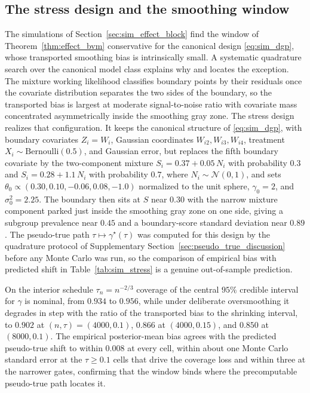 \documentclass[11pt]{article}
\theoremstyle{definition}
\theoremstyle{plain}
\begin{document}
\subsection{The stress design and the smoothing window}
\label{sec:stress_design}

The simulations of Section~\ref{sec:sim_effect_block} find the window of Theorem~\ref{thm:effect_bvm} conservative for the canonical design \eqref{eq:sim_dgp}, whose transported smoothing bias is intrinsically small. A systematic quadrature search over the canonical model class explains why and locates the exception. The mixture working likelihood classifies boundary points by their residuals once the covariate distribution separates the two sides of the boundary, so the transported bias is largest at moderate signal-to-noise ratio with covariate mass concentrated asymmetrically inside the smoothing gray zone. The stress design realizes that configuration. It keeps the canonical structure of \eqref{eq:sim_dgp}, with boundary covariates $Z_i=W_i$, Gaussian coordinates $W_{i2},W_{i3},W_{i4}$, treatment $X_i\sim\mathrm{Bernoulli}(0.5)$, and Gaussian error, but replaces the fifth boundary covariate by the two-component mixture $S_i=0.37+0.05\,N_i$ with probability $0.3$ and $S_i=0.28+1.1\,N_i$ with probability $0.7$, where $N_i\sim\mathcal N(0,1)$, and sets $\theta_0\propto(0.30,0.10,-0.06,0.08,-1.0)$ normalized to the unit sphere, $\gamma_0=2$, and $\sigma_0^2=2.25$. The boundary then sits at $S$ near $0.30$ with the narrow mixture component parked just inside the smoothing gray zone on one side, giving a subgroup prevalence near $0.45$ and a boundary-score standard deviation near $0.89$. The pseudo-true path $\tau\mapsto\gamma^\star(\tau)$ was computed for this design by the quadrature protocol of Supplementary Section~\ref{sec:pseudo_true_discussion} before any Monte Carlo was run, so the comparison of empirical bias with predicted shift in Table~\ref{tab:sim_stress} is a genuine out-of-sample prediction.

On the interior schedule $\tau_n=n^{-2/3}$ coverage of the central $95\%$ credible interval for $\gamma$ is nominal, from $0.934$ to $0.956$, while under deliberate oversmoothing it degrades in step with the ratio of the transported bias to the shrinking interval, to $0.902$ at $(n,\tau)=(4000,0.1)$, $0.866$ at $(4000,0.15)$, and $0.850$ at $(8000,0.1)$. The empirical posterior-mean bias agrees with the predicted pseudo-true shift to within $0.008$ at every cell, within about one Monte Carlo standard error at the $\tau\ge0.1$ cells that drive the coverage loss and within three at the narrower gates, confirming that the window binds where the precomputable pseudo-true path locates it.
\end{document}
